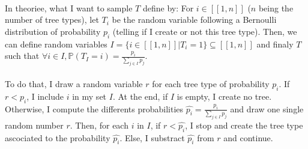 \documentclass[a4paper,12pt]{article}
\begin{document}


\paragraph{} In theoriee, what I want to sample $T$ define by:
\newline For $i \in [\![ 1, n ]\!]$ ($n$ being the number of tree types), let $T_i$ be the random variable following a Bernoulli distribution of probability $p_i$ (telling if I create or not this tree type). Then, we can define random variables $I = \{i \in [\![ 1, n ]\!] | T_i = 1\} \subseteq [\![ 1, n ]\!]$ and finaly $T$ such that $\forall i \in I, \mathbb{P}(T_I = i) = \frac{p_i}{\sum_{j \in I}p_j}$.

\paragraph{} To do that, I draw a random variable $r$ for each tree type of probability $p_i$. If $r < p_i$, I include $i$ in my set $I$. 
\newline At the end, if $I$ is empty, I create no tree.
\newline Otherwise, I compute the differents probabilities $\hat{p_i} = \frac{p_i}{\sum_{j \in I}p_j}$ and draw one single random number $r$. Then, for each $i$ in $I$, if $r < \hat{p_i}$, I stop and create the tree type ascociated to the probability $\hat{p_i}$. Else, I substract $\hat{p_i}$ from $r$ and continue.



\end{document}
